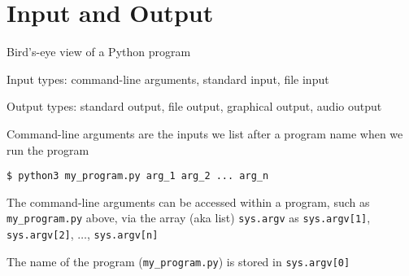 \documentclass[8pt,a4paper,compress]{beamer}
\begin{document}
\section{Input and Output}
\begin{frame}[fragile]
\pause

Bird's-eye view of a Python program
\begin{center}
\end{center}

\pause
Input types: command-line arguments, standard input, file input

\pause\bigskip
Output types: standard output, file output, graphical output, audio output
\end{frame}

\begin{frame}[fragile]
\pause

Command-line arguments are the inputs we list after a program name when we run the program

\bigskip

\begin{lstlisting}[language={},style=focusin]
$ python3 my_program.py arg_1 arg_2 ... arg_n
\end{lstlisting}

\pause\bigskip

The command-line arguments can be accessed within a program, such as \lstinline{my_program.py} above, via the array (aka list) \lstinline{sys.argv} as \lstinline{sys.argv[1]}, \lstinline{sys.argv[2]}, $\dots$, \lstinline{sys.argv[n]}

\pause\bigskip

The name of the program (\lstinline{my_program.py}) is stored in \lstinline{sys.argv[0]} 
\end{frame}
\end{document}
